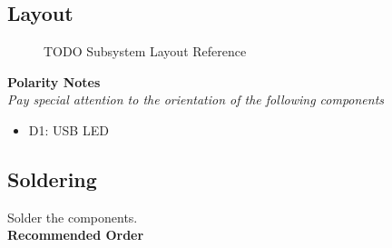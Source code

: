 \documentclass{article}
\begin{document}
\subsection{Layout}


\begin{figure}[H]
    \centering
        \qquad
        \caption{TODO Subsystem Layout Reference}%
    \label{fig:TODO-layout}%
\end{figure}

\noindent \textbf{Polarity Notes}\\
\noindent \textit{Pay special attention to the orientation of the following components}
\begin{itemize}
  \item D1: USB LED
\end{itemize}

\subsection{Soldering}

Solder the components. \\

\noindent \textbf{Recommended Order}
\end{document}
